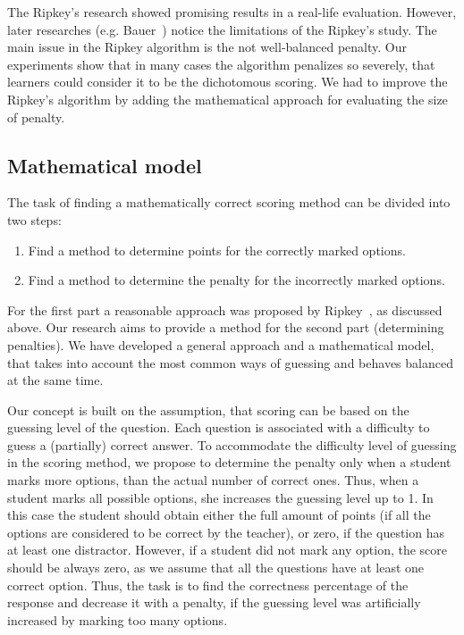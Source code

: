 \documentclass[PhD, Submit, ngerman,UKenglish,table]{scrbook}
\begin{document}
The Ripkey's research showed promising results in a real-life evaluation.
However, later researches (e.g. Bauer~\cite{Bauer2011}) notice the limitations of the Ripkey's study.
The main issue in the Ripkey algorithm is the not well-balanced penalty.
Our experiments show that in many cases the algorithm penalizes so severely, that learners could consider it to be the dichotomous scoring. 
We had to improve the Ripkey's algorithm by adding the mathematical approach for evaluating the size of penalty.

\subsection{Mathematical model} %
\label{subsec:math_model}

The task of finding a mathematically correct scoring method can be divided into two steps:

\begin{enumerate}
	\item Find a method to determine points for the correctly marked options.
	\item Find a method to determine the penalty for the incorrectly marked options.
\end{enumerate}

For the first part a reasonable approach was proposed by Ripkey~\cite{Ripkey1996}, as discussed above.
Our research aims to provide a method for the second part (determining penalties).
We have developed a general approach and a mathematical model, that takes into account the most common ways of guessing and behaves balanced at the same time.

Our concept is built on the assumption, that scoring can be based on the guessing level of the question.
Each question is associated with a difficulty to guess a (partially) correct answer.
To accommodate the difficulty level of guessing in the scoring method, we propose to determine the penalty only when a student marks more options, than the actual number of correct ones.
Thus, when a student marks all possible options, she increases the guessing level up to 1. 
In this case the student should obtain either the full amount of points (if all the options are considered to be correct by the teacher), or zero, if the question has at least one distractor. 
However, if a student did not mark any option, the score should be always zero, as we assume that all the questions have at least one correct option.
Thus, the task is to find the correctness percentage of the response and decrease it with a penalty, if the guessing level was artificially increased by marking too many options.
\end{document}
